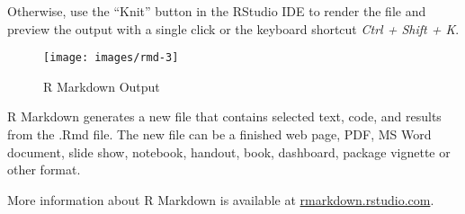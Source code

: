 \documentclass[]{book}
\begin{document}
Otherwise, use the ``Knit'' button in the RStudio IDE to render the file
and preview the output with a single click or the keyboard shortcut
\emph{Ctrl + Shift + K}.

\begin{figure}[h]
\texttt{[image: images/rmd-3]} \caption{R Markdown Output}\label{fig:g3}
\end{figure}

R Markdown generates a new file that contains selected text, code, and
results from the .Rmd file. The new file can be a finished web page,
PDF, MS Word document, slide show, notebook, handout, book, dashboard,
package vignette or other format.

More information about R Markdown is available at
\href{http://rmarkdown.rstudio.com/}{rmarkdown.rstudio.com}.
\end{document}
